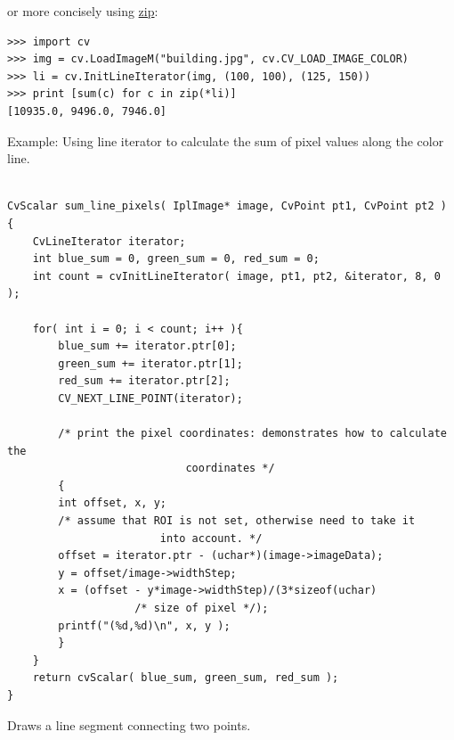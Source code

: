 or more concisely using \href{http://docs.python.org/library/functions.html\#zip}{zip}:

\begin{lstlisting}
>>> import cv
>>> img = cv.LoadImageM("building.jpg", cv.CV_LOAD_IMAGE_COLOR)
>>> li = cv.InitLineIterator(img, (100, 100), (125, 150))
>>> print [sum(c) for c in zip(*li)]
[10935.0, 9496.0, 7946.0]
\end{lstlisting}
\fi

\ifC
Example: Using line iterator to calculate the sum of pixel values along the color line.

\begin{lstlisting}

CvScalar sum_line_pixels( IplImage* image, CvPoint pt1, CvPoint pt2 )
{
    CvLineIterator iterator;
    int blue_sum = 0, green_sum = 0, red_sum = 0;
    int count = cvInitLineIterator( image, pt1, pt2, &iterator, 8, 0 );

    for( int i = 0; i < count; i++ ){
        blue_sum += iterator.ptr[0];
        green_sum += iterator.ptr[1];
        red_sum += iterator.ptr[2];
        CV_NEXT_LINE_POINT(iterator);

        /* print the pixel coordinates: demonstrates how to calculate the 
							coordinates */
        {
        int offset, x, y;
        /* assume that ROI is not set, otherwise need to take it 
						into account. */
        offset = iterator.ptr - (uchar*)(image->imageData);
        y = offset/image->widthStep;
        x = (offset - y*image->widthStep)/(3*sizeof(uchar) 
					/* size of pixel */);
        printf("(%d,%d)\n", x, y );
        }
    }
    return cvScalar( blue_sum, green_sum, red_sum );
}

\end{lstlisting}
\fi

Draws a line segment connecting two points.


\begin{description}
\end{description}

